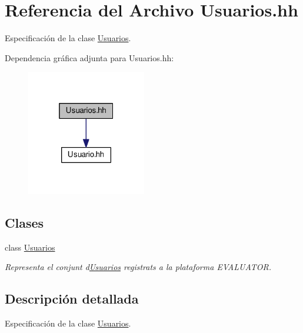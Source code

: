 \hypertarget{_usuarios_8hh}{}\section{Referencia del Archivo Usuarios.\+hh}
\label{_usuarios_8hh}


Especificación de la clase \mbox{\hyperlink{class_usuarios}{Usuarios}}.  


Dependencia gráfica adjunta para Usuarios.\+hh\+:
\nopagebreak
\begin{figure}[H]
\begin{center}
\leavevmode
\includegraphics[width=148pt]{_usuarios_8hh__incl}
\end{center}
\end{figure}
\subsection*{Clases}
\begin{DoxyCompactItemize}
\item 
class \mbox{\hyperlink{class_usuarios}{Usuarios}}
\begin{DoxyCompactList}\small\item\em Representa el conjunt d\textquotesingle{}\mbox{\hyperlink{class_usuarios}{Usuarios}} registrats a la plataforma E\+V\+A\+L\+U\+A\+T\+OR. \end{DoxyCompactList}\end{DoxyCompactItemize}


\subsection{Descripción detallada}
Especificación de la clase \mbox{\hyperlink{class_usuarios}{Usuarios}}. 

